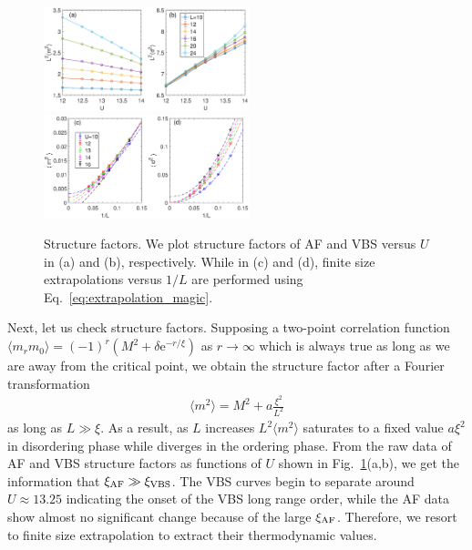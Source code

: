 \documentclass[twocolumn,superscriptaddress]{revtex4-1}
\begin{document}
\begin{figure}
  \includegraphics[width=0.53\textwidth]{structurefactor} \\
  \includegraphics[width=0.53\textwidth]{extrapolation}
  \caption{\label{fig:structurefactor}Structure factors. We plot structure factors of AF and VBS versus $U$ in (a) and (b), respectively. While in (c) and (d), finite size extrapolations versus $1/L$ are performed using Eq.~\ref{eq:extrapolation_magic}.}
\end{figure}
Next, let us check structure factors. Supposing a two-point correlation function $\langle m_rm_0 \rangle=(-1)^r(M^2 + \delta\mathrm{e}^{-r/\xi})$ as $r\rightarrow\infty$ which is always true as long as we are away from the critical point, we obtain the structure factor after a Fourier transformation 
\begin{eqnarray}\label{eq:extrapolation}
  \langle m^2 \rangle=M^2+a\frac{\xi^2}{L^2}
\end{eqnarray}
as long as $L\gg\xi$. As a result, as $L$ increases $L^2\langle m^2 \rangle$ saturates to a fixed value $a\xi^2$ in disordering phase while diverges in the ordering phase. From the raw data of AF and VBS structure factors as functions of $U$ shown in Fig.~\ref{fig:structurefactor}(a,b), we get the information that $\xi_{\rm AF}\gg\xi_{\rm VBS}$. The VBS curves begin to separate around $U\approx13.25$ indicating the onset of the VBS long range order, while the AF data show almost no significant change because of the large $\xi_{\rm AF}$. Therefore, we resort to finite size extrapolation to extract their thermodynamic values. 
\end{document}
